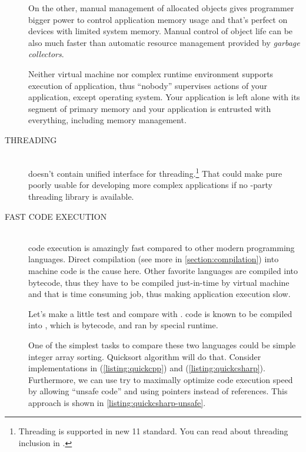 \begin{description}
On the other, manual management of allocated objects gives programmer bigger power to control application memory usage and that's perfect on devices with limited system memory. Manual control of object life can be also much faster than automatic resource management provided by \textit{garbage collectors}.

Neither virtual machine nor complex runtime environment supports execution of \cpp{} application, thus \enquote{nobody} supervises actions of your application, except operating system. Your application is left alone with its segment of primary memory and your application is entrusted with everything, including memory management.

\item[THREADING\ts{\textcolor{red}{bad}}]\hfill \\
\cpp{} doesn't contain unified interface for threading.\footnote{Threading is supported in new \cpp{} 11 standard. You can read about threading inclusion in \citep[p.~1114-1160]{various:cppstandard}.} That could make pure \cpp{} poorly usable for developing more complex applications if no -party threading library is available.

\item[FAST CODE EXECUTION\ts{\textcolor{YellowOrange}{great}}]\hfill \\
\cpp{} code execution is amazingly fast compared to other modern programming languages. Direct compilation (see more in \autoref{section:compilation})  into machine code is the cause here. Other favorite languages are compiled into bytecode, thus they have to be compiled just-in-time by virtual machine and that is time consuming job, thus making application execution slow.

Let's make a little test and compare \cpp{} with \csharp. \csharp{} code is known to be compiled into , which is bytecode, and ran by special runtime.

One of the simplest tasks to compare these two languages could be simple integer array sorting. Quicksort algorithm will do that. Consider implementations in \cpp{} (\autoref{listing:quickcpp}) and \csharp{} (\autoref{listing:quickcsharp}). Furthermore, we can use try to maximally optimize \csharp{} code execution speed by allowing \enquote{unsafe code} and using pointers instead of references. This approach is shown in \autoref{listing:quickcsharp-unsafe}.


\end{description}
